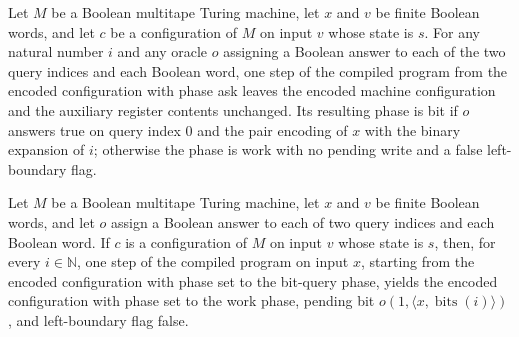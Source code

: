 \begin{theorem}
\label{Complexity.LogProg.OIS.ask_step}
\leanok
{}
Let $M$ be a Boolean multitape Turing machine, let $x$ and $v$ be finite Boolean words,
and let $c$ be a configuration of $M$ on input $v$ whose state is $s$. For any natural
number $i$ and any oracle $o$ assigning a Boolean answer to each of the two query
indices and each Boolean word, one step of the compiled program from the encoded
configuration with phase ask leaves the encoded machine configuration and the auxiliary
register contents unchanged. Its resulting phase is bit if $o$ answers true on query
index $0$ and the pair encoding of $x$ with the binary expansion of $i$; otherwise the
phase is work with no pending write and a false left-boundary flag.
\end{theorem}

\begin{theorem}
\label{Complexity.LogProg.OIS.bit_step}
\leanok
{}
Let $M$ be a Boolean multitape Turing machine, let $x$ and $v$ be finite Boolean words,
and let $o$ assign a Boolean answer to each of two query indices and each Boolean word.
If $c$ is a configuration of $M$ on input $v$ whose state is $s$, then, for every
$i\in\mathbb N$, one step of the compiled program on input $x$, starting from the
encoded configuration with phase set to the bit-query phase, yields the encoded
configuration with phase set to the work phase, pending bit $o(1,\langle
x,\operatorname{bits}(i)\rangle)$, and left-boundary flag false.
\end{theorem}


